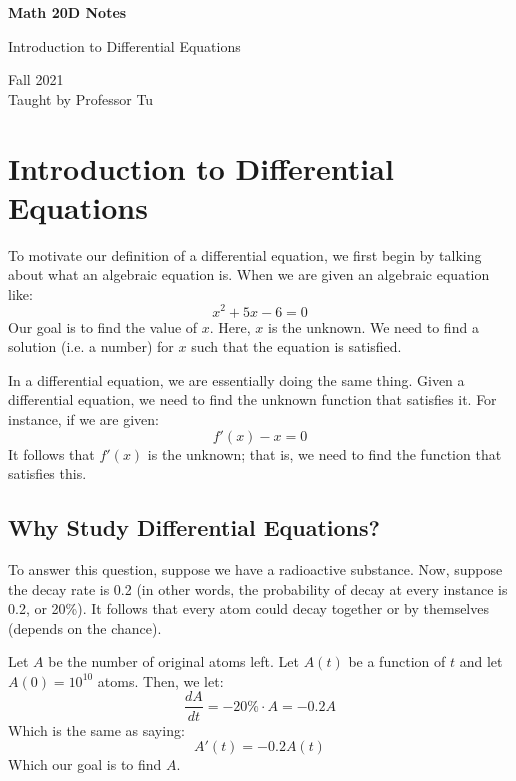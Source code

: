 \documentclass[letterpaper]{article}
\begin{document}
\begin{titlepage}
    \begin{center}
        \vspace*{1cm}
            
        \Huge
        \textbf{Math 20D Notes}
            
        \vspace{0.5cm}
        \LARGE
        Introduction to Differential Equations
            
        \vspace{1.5cm}
            
        \vfill
            
        Fall 2021\\
        Taught by Professor Tu
    \end{center}
\end{titlepage}


\newpage 

\begingroup
    \renewcommand\contentsname{Table of Contents}
    \tableofcontents
\endgroup

\newpage
{}

\section{Introduction to Differential Equations}
To motivate our definition of a differential equation, we first begin by talking about what an algebraic equation is. When we are given an algebraic equation like: 
\[x^2 + 5x - 6 = 0\]
Our goal is to find the value of $x$. Here, $x$ is the unknown. We need to find a solution (i.e. a number) for $x$ such that the equation is satisfied. 

\bigskip 

In a differential equation, we are essentially doing the same thing. Given a differential equation, we need to find the unknown function that satisfies it. For instance, if we are given: 
\[f'(x) - x = 0\]
It follows that $f'(x)$ is the unknown; that is, we need to find the function that satisfies this.

\subsection{Why Study Differential Equations?}
To answer this question, suppose we have a radioactive substance. Now, suppose the decay rate is 0.2 (in other words, the probability of decay at every instance is 0.2, or 20\%). It follows that every atom could decay together or by themselves (depends on the chance). 

\bigskip 

Let $A$ be the number of original atoms left. Let $A(t)$ be a function of $t$ and let $A(0) = 10^{10}$ atoms. Then, we let: 
\[\frac{dA}{dt} = -20\% \cdot A = \boxed{-0.2A}\]
Which is the same as saying: 
\[A'(t) = -0.2A(t)\]
Which our goal is to find $A$. 
\end{document}
